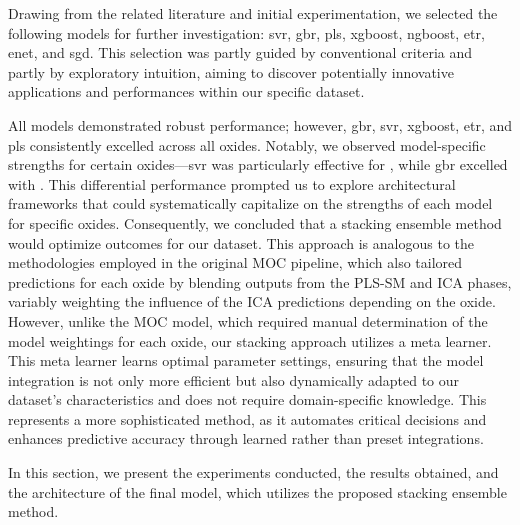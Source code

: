 Drawing from the related literature and initial experimentation, we selected the following models for further investigation: \gls{svr}, \gls{gbr}, \gls{pls}, \gls{xgboost}, \gls{ngboost}, \gls{etr}, \gls{enet}, and \gls{sgd}.
This selection was partly guided by conventional criteria and partly by exploratory intuition, aiming to discover potentially innovative applications and performances within our specific dataset.

All models demonstrated robust performance; however, \gls{gbr}, \gls{svr}, \gls{xgboost}, \gls{etr}, and \gls{pls} consistently excelled across all oxides.
Notably, we observed model-specific strengths for certain oxides—\gls{svr} was particularly effective for , while \gls{gbr} excelled with .
This differential performance prompted us to explore architectural frameworks that could systematically capitalize on the strengths of each model for specific oxides.
Consequently, we concluded that a stacking ensemble method would optimize outcomes for our dataset.
This approach is analogous to the methodologies employed in the original MOC pipeline, which also tailored predictions for each oxide by blending outputs from the PLS-SM and ICA phases, variably weighting the influence of the ICA predictions depending on the oxide.
However, unlike the MOC model, which required manual determination of the model weightings for each oxide, our stacking approach utilizes a meta learner.
This meta learner learns optimal parameter settings, ensuring that the model integration is not only more efficient but also dynamically adapted to our dataset's characteristics and does not require domain-specific knowledge.
This represents a more sophisticated method, as it automates critical decisions and enhances predictive accuracy through learned rather than preset integrations.

In this section, we present the experiments conducted, the results obtained, and the architecture of the final model, which utilizes the proposed stacking ensemble method.

